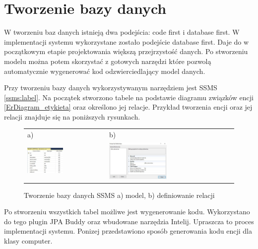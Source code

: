 \section{Tworzenie bazy danych}
W tworzeniu baz danych istnieją dwa podejścia: code first i database first. W implementacji systemu wykorzystane zostało podejście database first. Daje do w początkowym etapie projektowania większą przejrzystość danych. Po stworzeniu modelu można potem skorzystać z gotowych narzędzi które pozwolą automatycznie wygenerować kod odzwierciedlający model danych.

Przy tworzeniu bazy danych wykorzystywanym narzędziem jest SSMS \ref{ssms:label}. 
Na początek stworzono tabele na podstawie diagramu związków encji \ref{ErDiagram_etykieta} oraz określono jej relacje. Przykład tworzenia encji oraz jej relacji znajduje się na poniższych rysunkach.

\begin{figure}[htb]
  \centering
	\begin{tabular}{@{}ll@{}}
	a) & b) \\
  \includegraphics[width=0.475\textwidth]{rys04/design.pdf} & 
	\includegraphics[width=0.475\textwidth]{rys04/relation.pdf}
	\end{tabular}
  \caption{Tworzenie bazy danych SSMS a) model, b) definiowanie relacji}
  \label{ssms_tworzenie:label}
\end{figure}

Po stworzeniu wszystkich tabel możliwe jest wygenerowanie kodu. Wykorzystano do tego plugin JPA Buddy oraz wbudowane narzędzia Intelij. Upraszcza to proces implementacji systemu. Ponizej przedstawiono sposób generowania kodu encji dla klasy computer.

